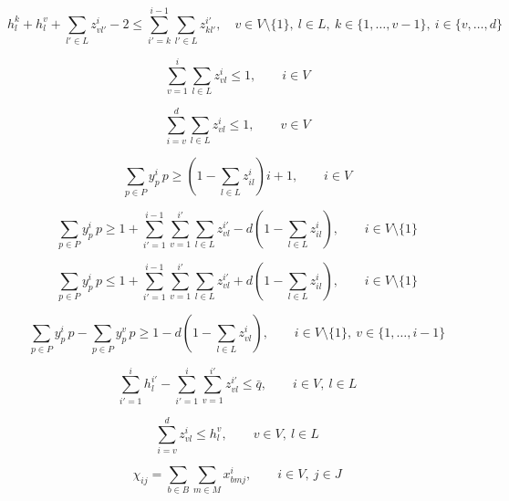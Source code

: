 \documentclass[10pt,a4paper]{article}
\begin{document}
\begin{equation}
h_l^k + h_l^v + \sum_{l' \in L} z_{vl'}^i - 2
\le
\sum_{i'=k}^{i-1} \sum_{l' \in L} z_{kl'}^{i'},
\quad
v \in V \setminus \{1\},\ l \in L,\ k \in \{1,\ldots,v-1\},\ i \in \{v,\ldots,d\}
\tag{11}
\end{equation}

\begin{equation}
\sum_{v=1}^{i} \sum_{l \in L} z_{vl}^i \le 1,
\qquad i \in V
\tag{12}
\end{equation}

\begin{equation}
\sum_{i=v}^{d} \sum_{l \in L} z_{vl}^i \le 1,
\qquad v \in V
\tag{13}
\end{equation}

\begin{equation}
\sum_{p \in P} y_p^i \, p
\ge
\left(1-\sum_{l \in L} z_{il}^i\right) i + 1,
\qquad i \in V
\tag{14}
\end{equation}

\begin{equation}
\sum_{p \in P} y_p^i \, p
\ge
1 + \sum_{i'=1}^{i-1} \sum_{v=1}^{i'} \sum_{l \in L} z_{vl}^{i'}
- d\left(1-\sum_{l \in L} z_{il}^i\right),
\qquad i \in V \setminus \{1\}
\tag{15}
\end{equation}

\begin{equation}
\sum_{p \in P} y_p^i \, p
\le
1 + \sum_{i'=1}^{i-1} \sum_{v=1}^{i'} \sum_{l \in L} z_{vl}^{i'}
+ d\left(1-\sum_{l \in L} z_{il}^i\right),
\qquad i \in V \setminus \{1\}
\tag{16}
\end{equation}

\begin{equation}
\sum_{p \in P} y_p^i \, p
- \sum_{p \in P} y_p^v \, p
\ge
1 - d\left(1-\sum_{l \in L} z_{vl}^i\right),
\qquad i \in V \setminus \{1\},\ v \in \{1,\ldots,i-1\}
\tag{17}
\end{equation}

\begin{equation}
\sum_{i'=1}^{i} h_l^{i'}
- \sum_{i'=1}^{i} \sum_{v=1}^{i'} z_{vl}^{i'}
\le \bar{q},
\qquad i \in V,\ l \in L
\tag{18}
\end{equation}

\begin{equation}
\sum_{i=v}^{d} z_{vl}^i \le h_l^v,
\qquad v \in V,\ l \in L
\tag{19}
\end{equation}

\begin{equation}
\chi_{ij} = \sum_{b \in B} \sum_{m \in M} x_{bmj}^i,
\qquad i \in V,\ j \in J
\tag{20a}
\end{equation}
\end{document}
